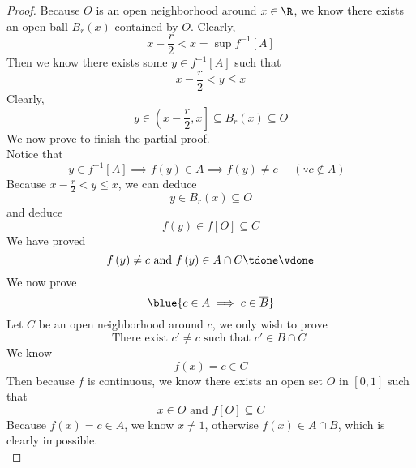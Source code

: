 \documentclass{report}
\begin{document}
\begin{proof}
Because $O$ is an open neighborhood around $x\in\R$, we know there exists an open ball $B_r\left(x \right)$ contained by $O$. Clearly,
\begin{equation*}
x-\frac{r}{2}<x=\sup f^{-1}\left[A \right]
\end{equation*}
Then we know there exists some $y\in f^{-1}\left[A \right]$ such that 
\begin{equation*}
x-\frac{r}{2}<y\leq x 
\end{equation*}
Clearly, 
\begin{equation*}
  y\in \left(x-\frac{r}{2},x \right]\subseteq B_r\left(x \right)\subseteq O
\end{equation*}
We now prove  to finish the partial proof.\\

Notice that 
\begin{equation*}
y\in f^{-1}\left[A \right]\implies f\left(y \right)\in A\implies f\left(y \right)\neq c\text{  }\text{     $\left(\because c\not\in A \right)$ }
\end{equation*}
Because $x-\frac{r}{2}<y\leq x$, we can deduce
\begin{equation*}
y\in B_r\left(x \right)\subseteq O
\end{equation*}
and deduce 
\begin{equation*}
f\left(y \right)\in f\left[O \right]\subseteq C
\end{equation*}
We have proved
\begin{equation*}
f\left(y \right)\neq c\text{ and }f\left(y \right)\in A\cap C\tdone\vdone
\end{equation*}
We now prove 
\begin{equation*}
\blue{c\in A\implies c\in \overline{B}}
\end{equation*}
Let $C$ be an open neighborhood around $c$, we only wish to prove 
 \begin{equation*}
\text{ There exist $c'\neq c$ such that $c'\in B\cap C$ }
\end{equation*}
We know 
\begin{equation*}
f\left(x \right)=c\in C
\end{equation*}
Then because $f$ is continuous, we know there exists an open set $O$ in  $\left[0,1 \right]$ such that  
\begin{equation*}
x\in O\text{ and }f\left[O \right]\subseteq C
\end{equation*}
Because $f\left(x \right)=c\in A$, we know $x\neq 1$, otherwise $f\left(x \right)\in A\cap B$, which is clearly impossible.\\


\end{proof}
\end{document}
